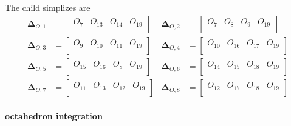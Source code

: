 \documentclass{mitschrift}
\newcommand{\simplex}{\boldsymbol{\Delta}}
\begin{document}
The child simplizes are \begin{align}
    \simplex_{O,1} &= \begin{bmatrix}
        O_7 & O_{13} & O_{14} & O_{19} \\
    \end{bmatrix} & \simplex_{O,2} &= \begin{bmatrix}
        O_7 & O_{8} & O_{9} & O_{19} \\
    \end{bmatrix} \\
    \simplex_{O,3} &= \begin{bmatrix}
        O_9 & O_{10} & O_{11} & O_{19} \\
    \end{bmatrix} & \simplex_{O,4} &= \begin{bmatrix}
        O_{10} & O_{16} & O_{17} & O_{19} \\
    \end{bmatrix} \\
    \simplex_{O,5} &= \begin{bmatrix}
        O_{15} & O_{16} & O_{8} & O_{19} \\
    \end{bmatrix} & \simplex_{O,6} &= \begin{bmatrix}
        O_{14} & O_{15} & O_{18} & O_{19} \\
    \end{bmatrix} \\
    \simplex_{O,7} &= \begin{bmatrix}
        O_{11} & O_{13} & O_{12} & O_{19} \\
    \end{bmatrix} & \simplex_{O,8} &= \begin{bmatrix}
        O_{12} & O_{17} & O_{18} & O_{19} \\
    \end{bmatrix}
\end{align}

\paragraph{octahedron integration}
\end{document}
